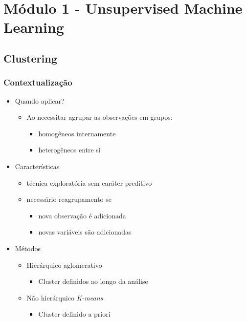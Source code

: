 \documentclass[
  letterpaper,
  DIV=11,
  numbers=noendperiod]{scrreprt}
\providecommand{\tightlist}{%
  \setlength{\itemsep}{0pt}\setlength{\parskip}{0pt}}\usepackage{longtable,booktabs,array}
\begin{document}
\part{Módulo 1 - Unsupervised Machine Learning}

\hypertarget{clustering}{%
\chapter{Clustering}\label{clustering}}

\hypertarget{contextualizauxe7uxe3o}{%
\section{Contextualização}\label{contextualizauxe7uxe3o}}

\begin{itemize}
\item
  Quando aplicar?

  \begin{itemize}
  \tightlist
  \item
    Ao necessitar agrupar as observações em grupos:

    \begin{itemize}
    \tightlist
    \item
      homogêneos internamente
    \item
      heterogêneos entre si
    \end{itemize}
  \end{itemize}
\item
  Características

  \begin{itemize}
  \tightlist
  \item
    técnica exploratória sem caráter preditivo
  \item
    necessário reagrupamento se

    \begin{itemize}
    \tightlist
    \item
      nova observação é adicionada
    \item
      novas variáveis são adicionadas
    \end{itemize}
  \end{itemize}
\item
  Métodos

  \begin{itemize}
  \tightlist
  \item
    Hierárquico aglomerativo

    \begin{itemize}
    \tightlist
    \item
      Cluster definidos ao longo da análise
    \end{itemize}
  \item
    Não hierárquico \emph{K-means}

    \begin{itemize}
    \tightlist
    \item
      Cluster definido a priori
    \end{itemize}
  \end{itemize}
\end{itemize}
\end{document}
